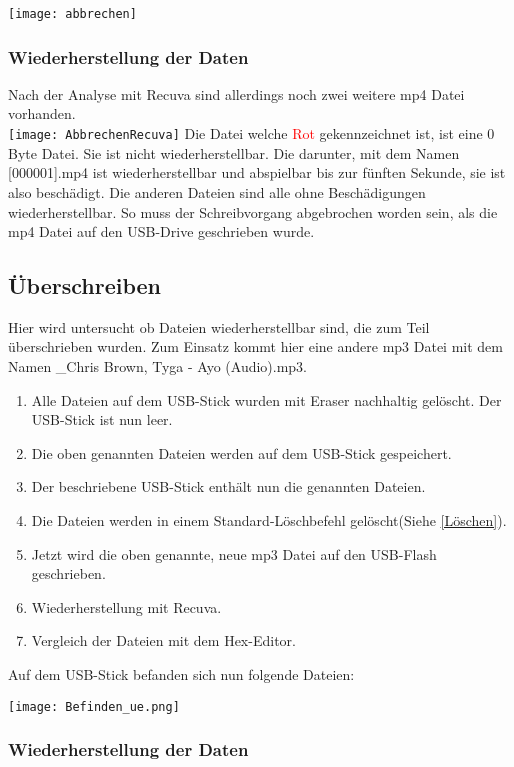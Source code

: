 \documentclass[10pt,a4paper]{article} %
\begin{document}
\texttt{[image: abbrechen]}

\subsubsection{Wiederherstellung der Daten}
Nach der Analyse mit Recuva sind allerdings noch zwei weitere mp4 Datei vorhanden.\\
\texttt{[image: AbbrechenRecuva]}
\newline
\newline
Die Datei welche \textcolor{red}{Rot} gekennzeichnet ist, ist eine 0 Byte Datei. Sie ist nicht wiederherstellbar. Die darunter, mit dem Namen [000001].mp4
ist wiederherstellbar und  abspielbar bis zur fünften Sekunde, sie ist also beschädigt. Die anderen Dateien sind alle ohne Beschädigungen wiederherstellbar. So muss der Schreibvorgang abgebrochen worden sein, als die mp4 Datei auf den USB-Drive geschrieben wurde.






\newpage
\subsection{Überschreiben}
Hier wird untersucht ob Dateien wiederherstellbar sind, die zum Teil überschrieben wurden.
Zum Einsatz kommt hier eine andere mp3 Datei mit dem Namen \_Chris Brown, Tyga - Ayo (Audio).mp3\grqq{}.
\begin{enumerate}
\item Alle Dateien auf dem USB-Stick wurden mit Eraser nachhaltig gelöscht. Der USB-Stick ist nun \glqq leer\grqq{}.
\item Die oben genannten Dateien werden auf dem USB-Stick gespeichert.
\item Der beschriebene USB-Stick enthält nun die genannten Dateien.
\item Die Dateien werden in einem Standard-Löschbefehl gelöscht(Siehe \ref{Löschen}).
\item Jetzt wird die oben genannte, neue mp3 Datei auf den USB-Flash geschrieben.
\item Wiederherstellung mit Recuva.
\item Vergleich der Dateien mit dem Hex-Editor.
\end{enumerate}
Auf dem USB-Stick befanden sich nun folgende Dateien:

\texttt{[image: Befinden\_ue.png]}


\subsubsection{Wiederherstellung der Daten}
\end{document}
